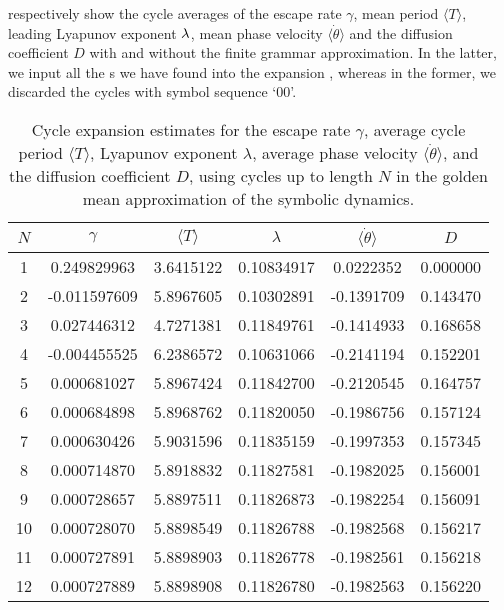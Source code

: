 \documentclass[aip,cha,
reprint,
secnumarabic,
nofootinbib, tightenlines,
nobibnotes, showkeys, showpacs,
superscriptaddress,
]{revtex4-1}
\begin{document}
{ respectively show
the cycle averages of the escape rate $\gamma$, mean period
$\langle T \rangle$, leading Lyapunov exponent $\lambda$, mean phase velocity
$\langle \dot{\theta} \rangle$ and the diffusion coefficient $D$
with and without the finite grammar approximation. In the latter, we input
all the \rpo s we have found into the expansion
, whereas in the former, we discarded the
cycles with symbol sequence `00'.
\begin{table}
    \caption{Cycle expansion estimates for
             the escape rate $\gamma$, average cycle period $\langle T \rangle$,
             Lyapunov exponent $\lambda$, average phase velocity
             $\langle \dot{\theta} \rangle$, and the diffusion coefficient $D$,
             using cycles up to length $N$ in the golden mean approximation
              of the symbolic dynamics.}
    \begin{tabular}{c|c|c|c|c|c}
     $N$ & $\gamma$ & $\langle T \rangle$ & $\lambda$ & $\langle \dot{\theta} \rangle$ & $D$ \\
    \hline
    1 & 0.249829963 & 3.6415122 & 0.10834917 & 0.0222352 & 0.000000 \\
    2 & -0.011597609 & 5.8967605 & 0.10302891 & -0.1391709 & 0.143470 \\
    3 & 0.027446312 & 4.7271381 & 0.11849761 & -0.1414933 & 0.168658 \\
    4 & -0.004455525 & 6.2386572 & 0.10631066 & -0.2141194 & 0.152201 \\
    5 & 0.000681027 & 5.8967424 & 0.11842700 & -0.2120545 & 0.164757 \\
    6 & 0.000684898 & 5.8968762 & 0.11820050 & -0.1986756 & 0.157124 \\
    7 & 0.000630426 & 5.9031596 & 0.11835159 & -0.1997353 & 0.157345 \\
    8 & 0.000714870 & 5.8918832 & 0.11827581 & -0.1982025 & 0.156001 \\
    9 & 0.000728657 & 5.8897511 & 0.11826873 & -0.1982254 & 0.156091 \\
    10 & 0.000728070 & 5.8898549 & 0.11826788 & -0.1982568 & 0.156217 \\
    11 & 0.000727891 & 5.8898903 & 0.11826778 & -0.1982561 & 0.156218 \\
    12 & 0.000727889 & 5.8898908 & 0.11826780 & -0.1982563 & 0.156220 \\
    \end{tabular}
    \label{t-DynamicalAverages}
\end{table}

}
\end{document}
